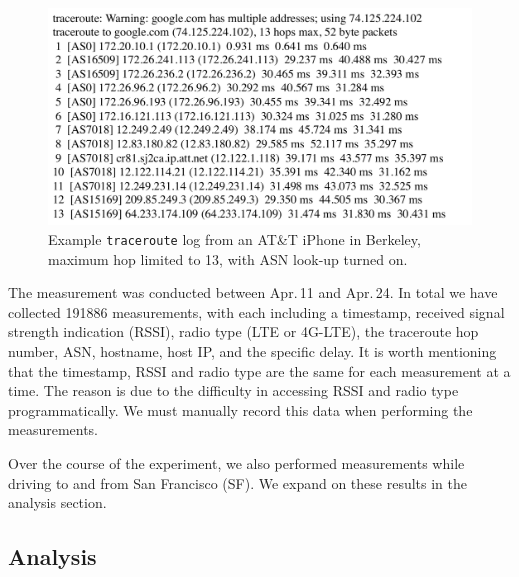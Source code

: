 \begin{figure}[!htb]
  \centering
  \includegraphics[width=1.1\linewidth]{../figs/traceroute.pdf}
  \vspace{-0.8em}
  \caption{Example \texttt{traceroute} log from an AT\&T iPhone in Berkeley, maximum hop limited to 13, with ASN look-up turned on.}
  \label{fig:traceroute}
\end{figure}


The measurement was conducted between Apr.\,11 and Apr.\,24. In total we have collected 191886 measurements, with each including a timestamp, received signal strength indication (RSSI), radio type (LTE or 4G-LTE), the traceroute hop number, ASN, hostname, host IP, and the specific delay. It is worth mentioning that the timestamp, RSSI and radio type are the same for each measurement at a time. The reason is due to the difficulty in accessing RSSI and radio type programmatically. We must manually record this data when performing the measurements.

Over the course of the experiment, we also performed measurements while driving to and from San Francisco (SF). We expand on these results in the analysis section. 

\subsection{Analysis}
\label{sec:analysis}

